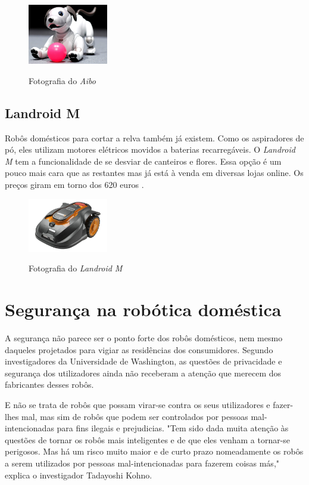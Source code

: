 \documentclass[10pt]{article}
\begin{document}
\begin{figure}[h]
\caption{Fotografia do \textit{Aibo}}
\centering
\includegraphics[width = 3.5cm]{img/7.4.jpg}
\label{figura:7.4}
\end{figure}


\subsection{Landroid M}

\hspace{\parindent}Robôs domésticos para cortar a relva também já existem. Como os aspiradores de pó, eles utilizam motores elétricos movidos a baterias recarregáveis. O \textit{Landroid M} tem a funcionalidade de se desviar de canteiros e flores. Essa opção é um pouco mais cara que as restantes mas já está à venda em diversas lojas online. Os preços giram em torno dos 620 euros \cite{examples}.

\begin{figure}[h]
\caption{Fotografia do \textit{Landroid M}}
\centering
\includegraphics[width = 3.5cm]{img/7.5.jpg}
\label{figura:7.5}
\end{figure}


\section{Segurança na robótica doméstica}

\hspace{\parindent}A segurança não parece ser o ponto forte dos robôs domésticos, nem mesmo daqueles projetados para vigiar as residências dos consumidores. Segundo investigadores da Universidade de Washington, as questões de privacidade e segurança dos utilizadores ainda não receberam a atenção que merecem dos fabricantes desses robôs.

E não se trata de robôs que possam virar-se contra os seus utilizadores e fazer-lhes mal, mas sim de robôs que podem ser controlados por pessoas mal-intencionadas para fins ilegais e prejudicias.
"Tem sido dada muita atenção às questões de tornar os robôs mais inteligentes e de que eles venham a tornar-se perigosos. Mas há um risco muito maior e de curto prazo nomeadamente os robôs a serem utilizados por pessoas mal-intencionadas para fazerem coisas más," explica o investigador Tadayoshi Kohno.
\end{document}
